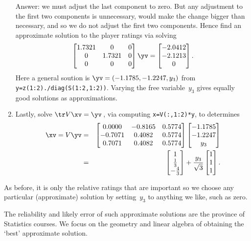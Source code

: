 \begin{example}
\begin{enumerate}
Answer: we must adjust the last component to zero. 
But any adjustment to the first two components is unnecessary, would make the change bigger than necessary, and so we do not adjust the first two components.
Hence find an approximate solution to the player ratings via solving
\begin{equation*}
\begin{bmatrix} 1.7321&0&0
\\0&1.7321&0
\\0&0&0 \end{bmatrix}\yv=\begin{bmatrix} 
   -2.0412\\-2.1213\\0
\end{bmatrix}.
\end{equation*}
Here a general soution is \(\yv=(-1.1785,-1.2247,y_3)\) from \verb|y=z(1:2)./diag(S(1:2,1:2))|.
Varying the free variable~\(y_3\) gives equally good solutions as approximations.

\item Lastly, solve \(\tr V\xv=\yv\)\,, via computing \verb|x=V(:,1:2)*y|, to determines
\begin{eqnarray*}
\xv=V\yv&=&
\begin{bmatrix} 0.0000 & -0.8165 & 0.5774
\\ -0.7071 & 0.4082 & 0.5774
\\  0.7071 & 0.4082 & 0.5774
 \end{bmatrix}\begin{bmatrix} -1.1785\\-1.2247\\y_3 \end{bmatrix}
\\&=&\begin{bmatrix} 1\\\frac13\\-\frac43 \end{bmatrix}
+\frac{y_3}{\sqrt3}\begin{bmatrix} 1\\1\\1 \end{bmatrix}.
\end{eqnarray*}
\end{enumerate}
As before, it is only the relative ratings that are important so we  choose any particular (approximate) solution by setting~\(y_3\) to anything we like, such as zero.
\end{example}

The reliability and likely error of such approximate solutions are the province of Statistics courses.
We focus on the geometry and linear algebra of obtaining the `best' approximate solution.



